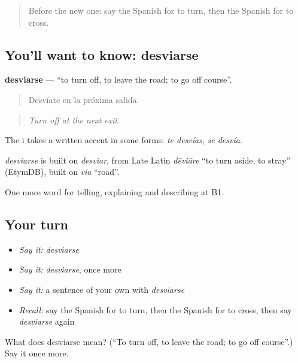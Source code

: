 \label{lesson:ES-C670-desviarse}



\begin{quote}
Before the new one: say the Spanish for to turn, then the Spanish for to cross.
\end{quote}

\subsection*{You'll want to know: desviarse}
\textbf{desviarse} — \textquotedblleft{}to turn off, to leave the road; to go off course\textquotedblright{}.

\begin{quote}
Desvíate en la próxima salida.
\end{quote}

\begin{quote}
\emph{Turn off at the next exit.}
\end{quote}

The i takes a written accent in some forms: \emph{te desvías}, \emph{se desvía}.

\begin{cousinweb}
\emph{desviarse} is built on \emph{desviar}, from Late Latin \emph{dēviāre} \textquotedblleft{}to turn aside, to stray\textquotedblright{} (EtymDB), built on \emph{via} \textquotedblleft{}road\textquotedblright{}.
\end{cousinweb}

\begin{grammarlens}[title={What you've built}]
One more word for telling, explaining and describing at B1.
\end{grammarlens}

\subsection*{Your turn}
\begin{itemize}
\raggedright
  \item \emph{Say it:} \emph{desviarse}
  \item \emph{Say it:} \emph{desviarse}, once more
  \item \emph{Say it:} a sentence of your own with \emph{desviarse}
  \item \emph{Recall:} say the Spanish for to turn, then the Spanish for to cross, then say \emph{desviarse} again
\end{itemize}

\begin{tcolorbox}[breakable,colback=teal!4,colframe=teal!35!black,title={Before you move on}]
What does desviarse mean? (\textquotedblleft{}To turn off, to leave the road; to go off course\textquotedblright{}.) Say it once more.
\end{tcolorbox}

